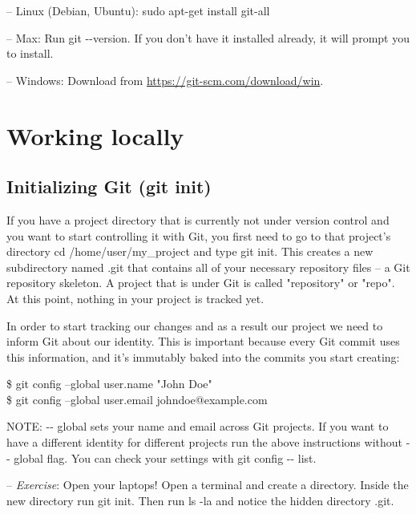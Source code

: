 \documentclass[12pt,a4]{article}
\newcommand{\ilcode}[1]{\textcolor[RGB]{160, 110, 220}{#1}}
\begin{document}
{\sf -- Linux (Debian, Ubuntu):} \ilcode{sudo apt-get install git-all}

{\sf -- Max:} Run \ilcode{git -{}-version}. If you don’t have it installed
already, it will prompt you to install.

{\sf -- Windows:} Download from \url{https://git-scm.com/download/win}.

\section{Working locally}
\subsection{Initializing Git (git init)}
If you have a project directory that is currently not under version control and
you want to start controlling it with Git, you first need to go to that
project’s directory \ilcode{cd /home/user/my\_project} and type \ilcode{git
init}. This creates a new subdirectory named .git that contains all of your
necessary repository files -- a Git repository skeleton. A project that is under
Git is called "repository" or "repo". At this point, nothing in your project is
tracked yet.

In order to start tracking our changes and as a result our project we need to
inform Git about our identity. This is important because every Git commit uses
this information, and it’s immutably baked into the commits you start creating:

\hspace*{1cm}
\ilcode{\$ git config --global user.name "John Doe"}\\
\hspace*{1cm}
\ilcode{\$ git config --global user.email johndoe@example.com}

{\sf NOTE:} \ilcode{-{}- global} sets your name and email across Git projects.
If you want to have a different identity for different projects run the above
instructions without \ilcode{-{}- global} flag. You can check your settings with
\ilcode{git config -{}- list}.

\begin{center}
\end{center}

{\sf -- \emph{Exercise}:} Open your laptops! Open a terminal and create a
directory. Inside the new directory run \ilcode{git init}. Then run \ilcode{ls
-la} and notice the hidden directory \ilcode{.git}.
\end{document}
